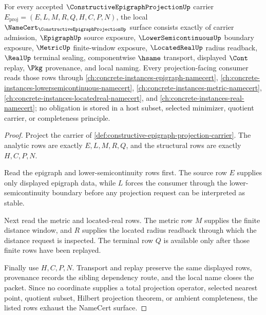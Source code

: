 \begin{theorem}
\label{thm:constructive-epigraph-projection-namecert-obligations}
For every accepted $\ConstructiveEpigraphProjectionUp$ carrier $E_{\mathrm{proj}}=(E,L,M,R,Q,H,C,P,N)$, the local $\NameCert_{\ConstructiveEpigraphProjectionUp}$ surface consists exactly of carrier admission, $\EpigraphUp$ source exposure, $\LowerSemicontinuousUp$ boundary exposure, $\MetricUp$ finite-window exposure, $\LocatedRealUp$ radius readback, $\RealUp$ terminal sealing, componentwise $\hsame$ transport, displayed $\Cont$ replay, $\Pkg$ provenance, and local naming. Every projection-facing consumer reads those rows through \autoref{ch:concrete-instances-epigraph-namecert}, \autoref{ch:concrete-instances-lowersemicontinuous-namecert}, \autoref{ch:concrete-instances-metric-namecert}, \autoref{ch:concrete-instances-locatedreal-namecert}, and \autoref{ch:concrete-instances-real-namecert}; no obligation is stored in a host subset, selected minimizer, quotient carrier, or completeness principle.
\end{theorem}
\begin{proof}
Project the carrier of \autoref{def:constructive-epigraph-projection-carrier}. The analytic rows are exactly $E,L,M,R,Q$, and the structural rows are exactly $H,C,P,N$.

Read the epigraph and lower-semicontinuity rows first. The source row $E$ supplies only displayed epigraph data, while $L$ forces the consumer through the lower-semicontinuity boundary before any projection request can be interpreted as stable.

Next read the metric and located-real rows. The metric row $M$ supplies the finite distance window, and $R$ supplies the located radius readback through which the distance request is inspected. The terminal row $Q$ is available only after those finite rows have been replayed.

Finally use $H,C,P,N$. Transport and replay preserve the same displayed rows, provenance records the sibling dependency route, and the local name closes the packet. Since no coordinate supplies a total projection operator, selected nearest point, quotient subset, Hilbert projection theorem, or ambient completeness, the listed rows exhaust the NameCert surface.
\end{proof}

